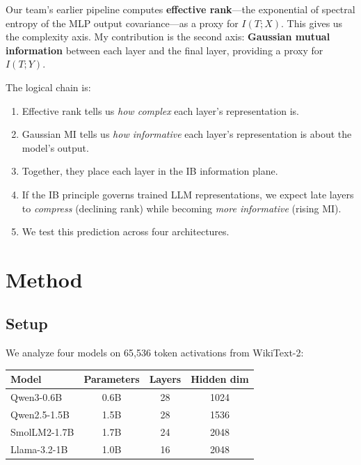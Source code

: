 \documentclass[11pt]{article}
\begin{document}
Our team's earlier pipeline computes \textbf{effective rank}---the exponential of spectral entropy of the MLP output covariance---as a proxy for $I(T;X)$. This gives us the complexity axis. My contribution is the second axis: \textbf{Gaussian mutual information} between each layer and the final layer, providing a proxy for $I(T;Y)$.

The logical chain is:
\begin{enumerate}
    \item Effective rank tells us \emph{how complex} each layer's representation is.
    \item Gaussian MI tells us \emph{how informative} each layer's representation is about the model's output.
    \item Together, they place each layer in the IB information plane.
    \item If the IB principle governs trained LLM representations, we expect late layers to \emph{compress} (declining rank) while becoming \emph{more informative} (rising MI).
    \item We test this prediction across four architectures.
\end{enumerate}

\section{Method}

\subsection{Setup}

We analyze four models on 65,536 token activations from WikiText-2:

\begin{table}[h]
\centering
\begin{tabular}{lccc}
\toprule
\textbf{Model} & \textbf{Parameters} & \textbf{Layers} & \textbf{Hidden dim} \\
\midrule
Qwen3-0.6B & 0.6B & 28 & 1024 \\
Qwen2.5-1.5B & 1.5B & 28 & 1536 \\
SmolLM2-1.7B & 1.7B & 24 & 2048 \\
Llama-3.2-1B & 1.0B & 16 & 2048 \\
\bottomrule
\end{tabular}
\end{table}
\end{document}
